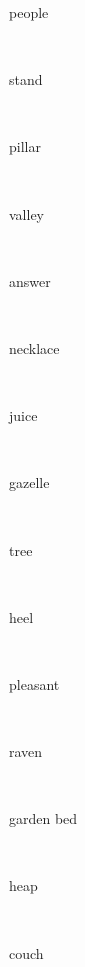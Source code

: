 \documentclass[a4paper]{article}
\begin{document}
\begin{multicols}{4}
\begin{multicols}{4}
\begin{multicols}{5}
{\hebrewfont{}} \begin{english}people\end{english}\\
{\hebrewfont{}} \begin{english}stand\end{english}\\
{\hebrewfont{}} \begin{english}pillar\end{english}\\
{\hebrewfont{}} \begin{english}valley\end{english}\\
{\hebrewfont{}} \begin{english}answer\end{english}\\
{\hebrewfont{}} \begin{english}necklace\end{english}\\
{\hebrewfont{}} \begin{english}juice\end{english}\\
{\hebrewfont{}} \begin{english}gazelle\end{english}\\
{\hebrewfont{}} \begin{english}tree\end{english}\\
{\hebrewfont{}} \begin{english}heel\end{english}\\
{\hebrewfont{}} \begin{english}pleasant\end{english}\\
{\hebrewfont{}} \begin{english}raven\end{english}\\
{\hebrewfont{}} \begin{english}garden bed\end{english}\\
{\hebrewfont{}} \begin{english}heap\end{english}\\
{\hebrewfont{}} \begin{english}couch\end{english}\\

\end{multicols}
\end{multicols}
\end{multicols}
\end{document}

